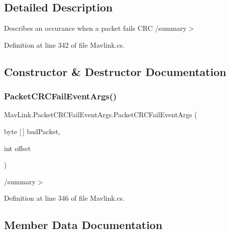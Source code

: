 \subsection{Detailed Description}
Describes an occurance when a packet fails C\+RC /summary$>$ 

Definition at line 342 of file Mavlink.\+cs.



\subsection{Constructor \& Destructor Documentation}
\mbox{\label{classMavLink_1_1PacketCRCFailEventArgs_ae4ed19b215ab5f71c63da96af562e65c}} 
\subsubsection{\texorpdfstring{PacketCRCFailEventArgs()}{PacketCRCFailEventArgs()}}
{\footnotesize\ttfamily Mav\+Link.\+Packet\+C\+R\+C\+Fail\+Event\+Args.\+Packet\+C\+R\+C\+Fail\+Event\+Args (\begin{DoxyParamCaption}\item[{byte \mbox{[}$\,$\mbox{]}}]{bad\+Packet,  }\item[{int}]{offset }\end{DoxyParamCaption})\hspace{0.3cm}{\ttfamily [inline]}}



/summary$>$ 



Definition at line 346 of file Mavlink.\+cs.



\subsection{Member Data Documentation}
\mbox{\label{classMavLink_1_1PacketCRCFailEventArgs_afd82c1af031117d7d64a27fc2c5d24a5}} 
